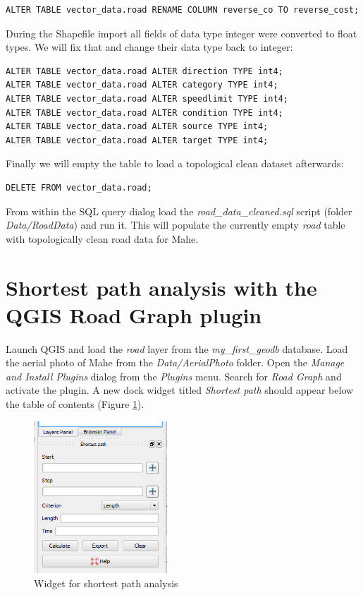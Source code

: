 \documentclass[a4paper,12pt,titlepage]{article}
\begin{document}
\begin{lstlisting}[caption={Renaming a column}]
ALTER TABLE vector_data.road RENAME COLUMN reverse_co TO reverse_cost; 
\end{lstlisting}

During the Shapefile import all fields of data type integer were converted to float types. We will fix that and change their data type back to integer:

\begin{lstlisting}[caption={Changing a column's data type}]
ALTER TABLE vector_data.road ALTER direction TYPE int4;
ALTER TABLE vector_data.road ALTER category TYPE int4;
ALTER TABLE vector_data.road ALTER speedlimit TYPE int4;
ALTER TABLE vector_data.road ALTER condition TYPE int4;
ALTER TABLE vector_data.road ALTER source TYPE int4;
ALTER TABLE vector_data.road ALTER target TYPE int4;
\end{lstlisting}

Finally we will empty the table to load a topological clean dataset afterwards:

\begin{lstlisting}[caption={Deleting data from a table}]
DELETE FROM vector_data.road; 
\end{lstlisting}

From within the SQL query dialog load the \textit{road\_data\_cleaned.sql} script (folder \textit{Data/RoadData}) and run it. This will populate the currently empty \textit{road} table with topologically clean road data for Mahe.

\section{Shortest path analysis with the QGIS Road Graph plugin}

Launch QGIS and load the \textit{road} layer from the \textit{my\_first\_geodb} database. Load the aerial photo of Mahe from the \textit{Data/AerialPhoto} folder. Open the \textit{Manage and Install Plugins} dialog from the \textit{Plugins} menu. Search for \textit{Road Graph} and activate the plugin. A new dock widget titled \textit{Shortest path} should appear below the table of contents (Figure \ref{fig:road_graph_dwidget}).

\begin{figure}[htb]
	\centering
	\includegraphics[width=5cm]{Images/road_graph_dwidget.png}
	\caption{Widget for shortest path analysis}\label{fig:road_graph_dwidget}
\end{figure}
\end{document}
